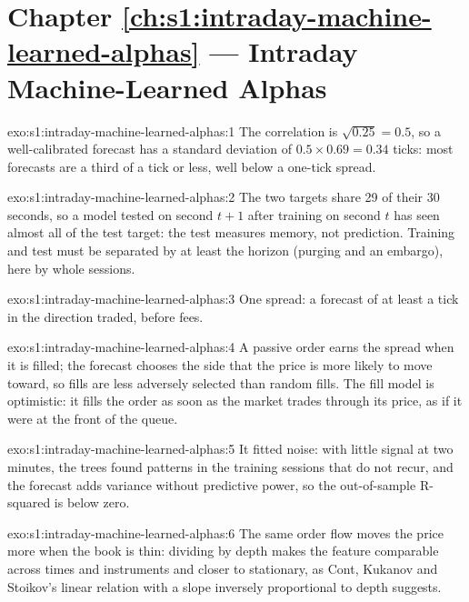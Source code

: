 \section*{Chapter \ref{ch:s1:intraday-machine-learned-alphas} --- Intraday Machine-Learned Alphas}

\begin{solution}{exo:s1:intraday-machine-learned-alphas:1}
The correlation is $\sqrt{0.25} = 0.5$, so a well-calibrated forecast has a standard deviation of $0.5 \times 0.69 = 0.34$ ticks: most forecasts are a third of a
tick or less, well below a one-tick spread.
\end{solution}

\begin{solution}{exo:s1:intraday-machine-learned-alphas:2}
The two targets share 29 of their 30 seconds, so a model tested on second $t + 1$ after training on second $t$ has seen almost all of the test target: the
test measures memory, not prediction. Training and test must be separated by at least the horizon (purging and an embargo), here by whole sessions.
\end{solution}

\begin{solution}{exo:s1:intraday-machine-learned-alphas:3}
One spread: a forecast of at least a tick in the direction traded, before fees.
\end{solution}

\begin{solution}{exo:s1:intraday-machine-learned-alphas:4}
A passive order earns the spread when it is filled; the forecast chooses the side that the price is more likely to move toward, so fills are less adversely
selected than random fills. The fill model is optimistic: it fills the order as soon as the market trades through its price, as if it were at the front of
the queue.
\end{solution}

\begin{solution}{exo:s1:intraday-machine-learned-alphas:5}
It fitted noise: with little signal at two minutes, the trees found patterns in the training sessions that do not recur, and the forecast adds variance
without predictive power, so the out-of-sample R-squared is below zero.
\end{solution}

\begin{solution}{exo:s1:intraday-machine-learned-alphas:6}
The same order flow moves the price more when the book is thin: dividing by depth makes the feature comparable across times and instruments and closer to
stationary, as Cont, Kukanov and Stoikov's linear relation with a slope inversely proportional to depth suggests.
\end{solution}

